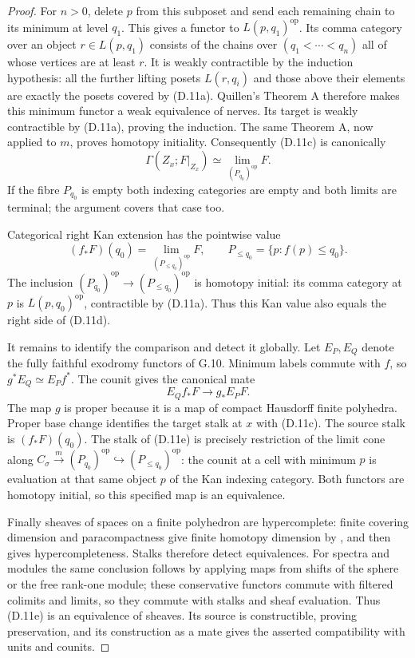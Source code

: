 \begin{proof}
For $n>0$, delete $p$ from this subposet and send each remaining
chain to its minimum at level $q_1$. This gives a functor to
$L(p,q_1)^{\mathrm{op}}$. Its comma category over an object
$r\in L(p,q_1)$ consists of the chains over
$(q_1<\cdots<q_n)$ all of whose vertices are at least $r$.
It is weakly contractible by the induction hypothesis: all the
further lifting posets $L(r,q_i)$ and those above their elements
are exactly the posets covered by (D.11a). Quillen's Theorem A
therefore makes this minimum functor a weak equivalence of nerves.
Its target is weakly contractible by (D.11a), proving the induction.
The same Theorem A, now applied to $m$, proves homotopy initiality.
Consequently (D.11c) is canonically
\[
 \Gamma(Z_x;F|_{Z_x})\simeq
             \lim_{(P_{q_0})^{\mathrm{op}}}F.
\tag{D.11d}
\]
If the fibre $P_{q_0}$ is empty both indexing categories are empty
and both limits are terminal; the argument covers that case too.

Categorical right Kan extension has the pointwise value
\[
 (f_*F)(q_0)=\lim_{(P_{\leq q_0})^{\mathrm{op}}}F,
 \qquad P_{\leq q_0}=\{p:f(p)\leq q_0\}.
\]
The inclusion $(P_{q_0})^{\mathrm{op}}\to
(P_{\leq q_0})^{\mathrm{op}}$ is homotopy initial: its comma
category at $p$ is $L(p,q_0)^{\mathrm{op}}$, contractible by
(D.11a). Thus this Kan value also equals the right side of (D.11d).

It remains to identify the comparison and detect it globally.
Let $E_P,E_Q$ denote the fully faithful exodromy functors of G.10.
Minimum labels commute with $f$, so
$g^*E_Q\simeq E_Pf^*$. The counit gives the canonical mate
\[
 E_Qf_*F\longrightarrow g_*E_PF.
\tag{D.11e}
\]
The map $g$ is proper because it is a map of compact Hausdorff
finite polyhedra. Proper base change identifies the target stalk
at $x$ with (D.11c). The source stalk is $(f_*F)(q_0)$.
The stalk of (D.11e) is precisely restriction of the limit cone
along
$C_\sigma\xrightarrow{m}(P_{q_0})^{\mathrm{op}}
\hookrightarrow(P_{\leq q_0})^{\mathrm{op}}$:
the counit at a cell with minimum $p$ is evaluation at that same
object $p$ of the Kan indexing category. Both functors are
homotopy initial, so this specified map is an equivalence.

Finally sheaves of spaces on a finite polyhedron are hypercomplete:
finite covering dimension and paracompactness give finite homotopy
dimension by \citet[Corollary 7.2.3.7]{DGLurieHTT}, and
\citet[Corollary 7.2.1.12]{DGLurieHTT}
then gives hypercompleteness. Stalks therefore detect equivalences.
For spectra and modules the same conclusion follows by applying
maps from shifts of the sphere or the free rank-one module;
these conservative functors commute with filtered colimits and
limits, so they commute with stalks and sheaf evaluation.
Thus (D.11e) is an equivalence of sheaves. Its source is
constructible, proving preservation, and its construction as a
mate gives the asserted compatibility with units and counits.
\end{proof}

